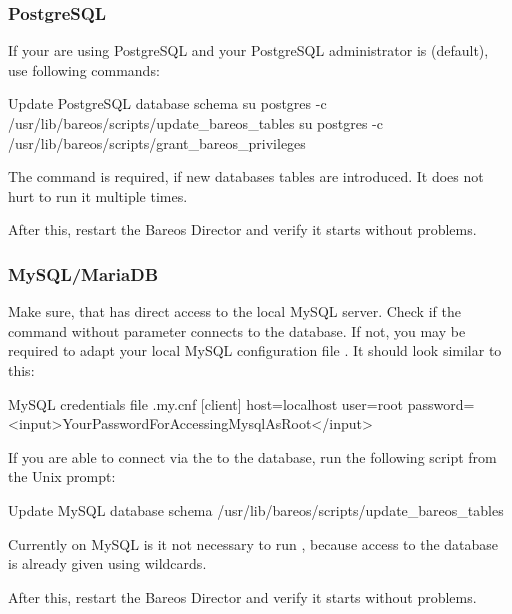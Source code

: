 
\subsubsection{PostgreSQL}
If your are using PostgreSQL and your PostgreSQL administrator is  (default), use following commands:

\begin{commands}{Update PostgreSQL database schema}
su postgres -c /usr/lib/bareos/scripts/update_bareos_tables
su postgres -c /usr/lib/bareos/scripts/grant_bareos_privileges
\end{commands}

The  command is required, if new databases tables are introduced. It does not hurt to run it multiple times.

After this, restart the Bareos Director and verify it starts without problems.

\subsubsection{MySQL/MariaDB}
Make sure, that  has direct access to the local MySQL server.
Check if the command  without parameter connects to the database.
If not, you may be required to adapt your local MySQL configuration file .
It should look similar to this:

\begin{config}{MySQL credentials file .my.cnf}
[client]
host=localhost
user=root
password=<input>YourPasswordForAccessingMysqlAsRoot</input>
\end{config}

If you are able to connect via the  to the database, run the following script from the Unix prompt:
\begin{commands}{Update MySQL database schema}
/usr/lib/bareos/scripts/update_bareos_tables
\end{commands}

Currently on MySQL is it not necessary to run , because access to the database is already given using wildcards.

After this, restart the Bareos Director and verify it starts without problems.
